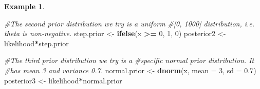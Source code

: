 \documentclass[
]{book}
\newenvironment{Shaded}{\begin{snugshade}}{\end{snugshade}}
\newcommand{\AttributeTok}[1]{\textcolor[rgb]{0.13,0.29,0.53}{#1}}
\newcommand{\CommentTok}[1]{\textcolor[rgb]{0.56,0.35,0.01}{\textit{#1}}}
\newcommand{\DecValTok}[1]{\textcolor[rgb]{0.00,0.00,0.81}{#1}}
\newcommand{\FloatTok}[1]{\textcolor[rgb]{0.00,0.00,0.81}{#1}}
\newcommand{\FunctionTok}[1]{\textcolor[rgb]{0.13,0.29,0.53}{\textbf{#1}}}
\newcommand{\NormalTok}[1]{#1}
\newcommand{\OtherTok}[1]{\textcolor[rgb]{0.56,0.35,0.01}{#1}}
\newcommand{\SpecialCharTok}[1]{\textcolor[rgb]{0.81,0.36,0.00}{\textbf{#1}}}
\theoremstyle{definition}
\theoremstyle{definition}
\newtheorem{example}{Example}[chapter]
\theoremstyle{definition}
\theoremstyle{definition}
\theoremstyle{remark}
\begin{document}
\begin{example}
\begin{Shaded}
\begin{Highlighting}[]
\CommentTok{\#The second prior distribution we try is a uniform }
\CommentTok{\#[0, 1000] distribution, i.e. theta is non{-}negative. }
\NormalTok{step.prior }\OtherTok{\textless{}{-}} \FunctionTok{ifelse}\NormalTok{(x }\SpecialCharTok{\textgreater{}=} \DecValTok{0}\NormalTok{, }\DecValTok{1}\NormalTok{, }\DecValTok{0}\NormalTok{)}
\NormalTok{posterior2 }\OtherTok{\textless{}{-}}\NormalTok{ likelihood}\SpecialCharTok{*}\NormalTok{step.prior}


\CommentTok{\#The third prior distribution we try is a}
\CommentTok{\#specific normal prior distribution. It}
\CommentTok{\#has mean 3 and variance 0.7.}
\NormalTok{normal.prior }\OtherTok{\textless{}{-}} \FunctionTok{dnorm}\NormalTok{(x, }\AttributeTok{mean =} \DecValTok{3}\NormalTok{, }\AttributeTok{sd =} \FloatTok{0.7}\NormalTok{)}
\NormalTok{posterior3 }\OtherTok{\textless{}{-}}\NormalTok{ likelihood}\SpecialCharTok{*}\NormalTok{normal.prior}


\end{Highlighting}
\end{Shaded}
\end{example}
\end{document}
